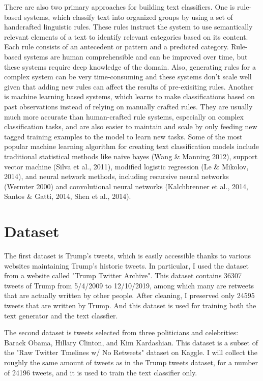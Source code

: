 \documentclass{article}
\begin{document}
There are also two primary approaches for building text classifiers. One is rule-based systems, which classify text into organized groups by using a set of handcrafted linguistic rules. These rules instruct the system to use semantically relevant elements of a text to identify relevant categories based on its content. Each rule consists of an antecedent or pattern and a predicted category. Rule-based systems are human comprehensible and can be improved over time, but these systems require deep knowledge of the domain. Also, generating rules for a complex system can be very time-consuming and these systems don't scale well given that adding new rules can affect the results of pre-exisiting rules. Another is machine learning based systems, which learns to make classifications based on past observations instead of relying on manually crafted rules. They are usually much more accurate than human-crafted rule systems, especially on complex classification tasks, and are also easier to maintain and scale by only feeding new tagged training examples to the model to learn new tasks. Some of the most popular machine learning algorithm for creating text classification models include traditional statistical methods like naive bayes (Wang \& Manning 2012), support vector machine (Silva et al., 2011), modified logistic regression (Le \& Mikolov, 2014), and neural network methods, including recursive neural networks (Wermter 2000) and convolutional neural networks (Kalchbrenner et al., 2014, Santos \& Gatti, 2014, Shen et al., 2014).

\section{Dataset}
The first dataset is Trump's tweets, which is easily accessible thanks to various websites maintaining Trump's historic tweets. In particular, I used the dataset from a website called "Trump Twitter Archive". This dataset contains 36307 tweets of Trump from 5/4/2009 to 12/10/2019, among which many are retweets that are actually written by other people. After cleaning, I preserved only 24595 tweets that are written by Trump.  And this dataset is used for training both the text generator and the text classfier.

The second dataset is tweets selected from three politicians and celebrities: Barack Obama, Hillary Clinton, and Kim Kardashian. This dataset is a subset of the "Raw Twitter Tmelines w/ No Retweets" dataset on Kaggle. I will collect the roughly the same amount of tweets as in the Trump tweets dataset, for a number of 24196 tweets, and it is used to train the text classifier only. 
\end{document}
